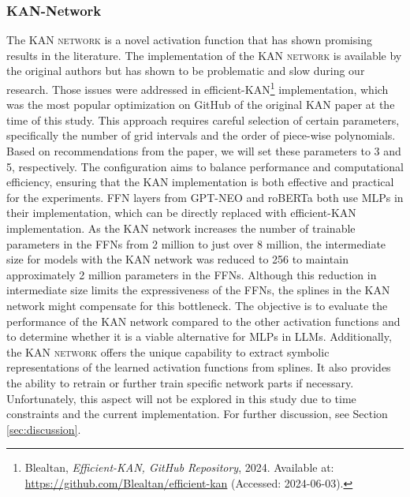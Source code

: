 
\subsubsection{KAN-Network}
The \textsc{KAN network} is a novel activation function that has shown promising results in the literature. The implementation of the \textsc{KAN network} is available by the original authors but has shown to be problematic and slow during our research. Those issues were addressed in efficient-KAN\footnote{\label{footnote:efficient-kan}Blealtan, \textit{Efficient-KAN, GitHub Repository}, 2024. Available at: \url{https://github.com/Blealtan/efficient-kan} (Accessed: 2024-06-03).} implementation, which was the most popular optimization on GitHub of the original KAN paper at the time of this study. This approach requires careful selection of certain parameters, specifically the number of grid intervals and the order of piece-wise polynomials. Based on recommendations from the paper, we will set these parameters to 3 and 5, respectively. The configuration aims to balance performance and computational efficiency, ensuring that the KAN implementation is both effective and practical for the experiments. FFN layers from GPT-NEO and roBERTa both use MLPs in their implementation, which can be directly replaced with efficient-KAN implementation. As the KAN network increases the number of trainable parameters in the FFNs from 2 million to just over 8 million, the intermediate size for models with the KAN network was reduced to 256 to maintain approximately 2 million parameters in the FFNs. Although this reduction in intermediate size limits the expressiveness of the FFNs, the splines in the KAN network might compensate for this bottleneck.
The objective is to evaluate the performance of the KAN network compared to the other activation functions and to determine whether it is a viable alternative for MLPs in LLMs. Additionally, the \textsc{KAN network} offers the unique capability to extract symbolic representations of the learned activation functions from splines. It also provides the ability to retrain or further train specific network parts if necessary. Unfortunately, this aspect will not be explored in this study due to time constraints and the current implementation. For further discussion, see Section \ref{sec:discussion}.